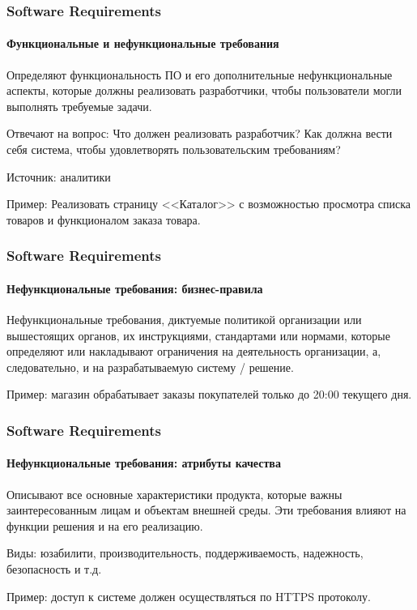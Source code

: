 \documentclass[aspectratio=169, 12pt]{beamer}
\begin{document}
\begin{frame}
    \frametitle{Software Requirements}
    \framesubtitle{Функциональные и нефункциональные требования}
    Определяют функциональность ПО и его дополнительные нефункциональные аспекты,
    которые должны реализовать разработчики, чтобы пользователи могли выполнять
    требуемые задачи. \newline \pause

    Отвечают на вопрос: Что должен реализовать разработчик?
    Как должна вести себя система, чтобы удовлетворять пользовательским требованиям? \newline \pause

    Источник: аналитики \newline \pause

    Пример: Реализовать страницу <<Каталог>> с возможностью просмотра списка товаров
    и функционалом заказа товара.
\end{frame}

\begin{frame}
    \frametitle{Software Requirements}
    \framesubtitle{Нефункциональные требования: бизнес-правила}
    Нефункциональные требования, диктуемые политикой организации или вышестоящих
    органов, их инструкциями, стандартами или нормами, которые определяют или
    накладывают ограничения на деятельность организации, а, следовательно, и на
    разрабатываемую систему / решение. \newline \pause

    Пример: магазин обрабатывает заказы покупателей только до 20:00 текущего дня.
\end{frame}

\begin{frame}
    \frametitle{Software Requirements}
    \framesubtitle{Нефункциональные требования: атрибуты качества}
    Описывают все основные характеристики продукта, которые важны
    заинтересованным лицам и объектам внешней среды. Эти требования
    влияют на функции решения и на его реализацию. \newline \pause

    Виды: юзабилити, производительность, поддерживаемость, надежность,
    безопасность и т.д. \newline \pause

    Пример: доступ к системе должен осуществляться по HTTPS протоколу.
\end{frame}
\end{document}
